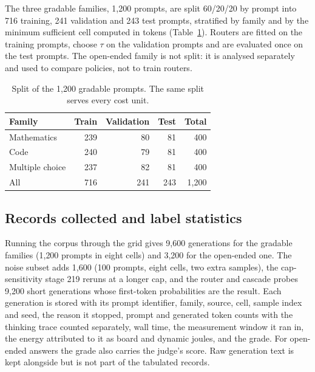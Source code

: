 The three gradable families, 1{,}200 prompts, are split 60/20/20 by prompt
into 716 training, 241 validation and 243 test prompts, stratified by family
and by the minimum sufficient cell computed in tokens
(Table~\ref{tab:splits}). Routers are fitted on the training prompts, choose
$\tau$ on the validation prompts and are evaluated once on the test prompts.
The open-ended family is not split: it is analysed separately and used to
compare policies, not to train routers.

\begin{table}[ht]
\centering
\caption{Split of the 1{,}200 gradable prompts. The same split serves every
cost unit.}
\label{tab:splits}
\begin{tabular}{@{}lrrrr@{}}
\toprule
Family & Train & Validation & Test & Total \\
\midrule
Mathematics     & 239 & 80 & 81 & 400 \\
Code            & 240 & 79 & 81 & 400 \\
Multiple choice & 237 & 82 & 81 & 400 \\
\midrule
All             & 716 & 241 & 243 & 1{,}200 \\
\bottomrule
\end{tabular}
\end{table}

\subsection{Records collected and label statistics}
\label{sec:data-records}

Running the corpus through the grid gives 9{,}600 generations for the
gradable families (1{,}200 prompts in eight cells) and 3{,}200 for the
open-ended one. The noise subset adds 1{,}600 (100 prompts, eight cells, two
extra samples), the cap-sensitivity stage 219 reruns at a longer cap, and the
router and cascade probes 9{,}200 short generations whose first-token
probabilities are the result. Each generation is stored with its prompt
identifier, family, source, cell, sample index and seed, the reason it
stopped, prompt and generated token counts with the thinking trace counted
separately, wall time, the measurement window it ran in, the energy
attributed to it as board and dynamic joules, and the grade. For open-ended
answers the grade also carries the judge's score. Raw generation text is kept
alongside but is not part of the tabulated records.

